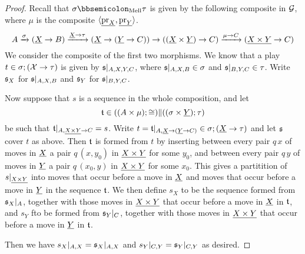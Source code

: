 \documentclass{report}[11pt]
\begin{document}
\begin{proof}
  Recall that $\sigma\semicom_{\text{Mell}}\tau$ is given by the following composite in $\mathcal G$, where $\mu$ is the composite $\langle{\underline{\operatorname{pr}_X}},{\underline{\operatorname{pr}_Y}}\rangle$.
  \[
    A \xrightarrow{\sigma}
    ({\underline{X}} \to B) \xrightarrow{{\underline{X}} \to \tau}
    ({\underline{X}} \to ({\underline{Y}} \to C)) \to
    (({\underline{X}} \times {\underline{Y}}) \to C) \xrightarrow{\mu\to C}
    ({\underline{X\times Y}} \to C)
    \]
  We consider the composite of the first two morphisms.  
  We know that a play $t\in \sigma;(\mathcal X\to \tau)$ is given by $\mathfrak s\vert_{A,X,Y,C}$, where $\mathfrak s\vert_{A,X,B}\in\sigma$ and $\mathfrak s\vert_{B,Y,C}\in\tau$.
  Write $\mathfrak s_X$ for $\mathfrak s\vert_{A,X,B}$ and $\mathfrak s_Y$ for $\mathfrak s\vert_{B,Y,C}$.

  Now suppose that $s$ is a sequence in the whole composition, and let
  \[
    \mathfrak t\in ((A\times\mu);\cong)\|((\sigma\times {\underline{Y}});\tau)
    \]
  be such that $\mathfrak t\vert_{A,{\underline{X \times Y}}\to C}=s$.
  Write $t=\mathfrak t\vert_{A,{\underline{X}} \to ({\underline{Y}} \to C)}\in\sigma;({\underline{X}} \to \tau)$ and let $\mathfrak s$ cover $t$ as above.
  Then $\mathfrak t$ is formed from $t$ by inserting between every pair $q\,x$ of moves in ${\underline{X}}$ a pair $q\,(x,y_0)$ in ${\underline{X\times Y}}$ for some $y_0$, and between every pair $q\,y$ of moves in ${\underline{Y}}$ a pair $q\,(x_0,y)$ in ${\underline{X \times Y}}$ for some $x_0$.
  This gives a partitition of $s\vert_{{\underline{X \times Y}}}$ into moves that occur before a move in ${\underline{X}}$ and moves that occur before a move in ${\underline{Y}}$ in the sequence $\mathfrak t$.
  We then define $s_X$ to be the sequence formed from $\mathfrak s_X\vert_A$, together with those moves in ${\underline{X \times Y}}$ that occur before a move in ${\underline{X}}$ in $\mathfrak t$, and $s_Y$ fto be formed from $\mathfrak s_Y\vert_C$, together with those moves in ${\underline{X\times Y}}$ that occur before a move in ${\underline{Y}}$ in $\mathfrak t$.

  Then we have $s_X\vert_{A,X}=\mathfrak s_X\vert_{A,X}$ and $s_Y\vert_{C,Y} = \mathfrak s_Y\vert_{C,Y}$ as desired.
\end{proof}
\end{document}
